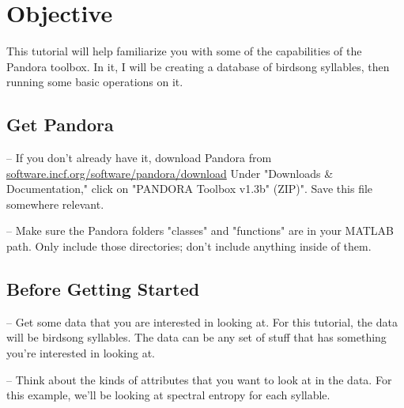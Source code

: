 \documentclass{article}
\let\oldmarginpar\marginpar
\renewcommand\marginpar[1]{\-\oldmarginpar[\raggedleft #1]%
{\raggedright #1}}
\newenvironment{checklist}{%
  \begin{list}{}{}%
  \let\olditem\item
  \renewcommand\item{\olditem -- \marginpar{$\Box$} }
  \newcommand\checkeditem{\olditem -- \marginpar{$\CheckedBox$} }
}{%
  \end{list}
}
\begin{document}


\section{Objective}

This tutorial will help familiarize you with some of the capabilities of the Pandora toolbox. In it, I will be creating a database of birdsong syllables, then running some basic operations on it.

\subsection{Get Pandora}

\begin{checklist}
	\item		If you don't already have it, download Pandora from \url{software.incf.org/software/pandora/download} Under "Downloads \& Documentation," click on "PANDORA Toolbox v1.3b" (ZIP)". Save this file somewhere relevant.
	\item		Make sure the Pandora folders "classes" and "functions" are in your MATLAB path. Only include those directories; don't include anything inside of them.
\end{checklist}

\subsection{Before Getting Started}

\begin{checklist}
	\item		Get some data that you are interested in looking at. For this tutorial, the data will be birdsong syllables. The data can be any set of stuff that has something you're interested in looking at.
	\item		Think about the kinds of attributes that you want to look at in the data. For this example, we'll be looking at spectral entropy for each syllable.
\end{checklist}
\end{document}
